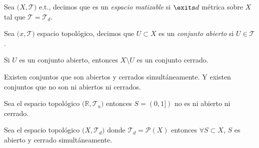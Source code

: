 \begin{defn}
  Sea $\big( X, \mathcal{T} \big)$ e.t., decimos que es un \textit{espacio matizable} si $\exits d$ métrica sobre $X$ tal que $\mathcal{T} = \mathcal{T}_{d}$.
\end{defn}

\begin{defn}
  Sea $\big( x, \mathcal{T} \big)$ espacio topológico, decimos que $U \subset X$ es un \textit{conjunto abierto} si $U \in \mathcal{T}$.
\end{defn}

\begin{obs}
  Si $U$ es un conjunto abierto, entonces $X \setminus U$ es un conjunto cerrado.
\end{obs}

\begin{obs}
  Existen conjuntos que son abiertos y cerrados simultáneamente. Y existen conjuntos que no son ni abiertos ni cerrados.
\end{obs}

\begin{ejm}
  Sea el espacio topológico $\big( \mathbb{R}, \mathcal{T}_{u} \big)$ entonces $S = (0,1])$ no es ni abierto ni cerrado.
\end{ejm}

\begin{ejm}
  Sea el espacio topológico $\big( X, \mathcal{T}_{d} \big)$ donde $\mathcal{T}_{d}=\mathcal{P}(X)$ entonces $\forall S \subset X$, $S$ es abierto y cerrado simultáneamente.
\end{ejm}
